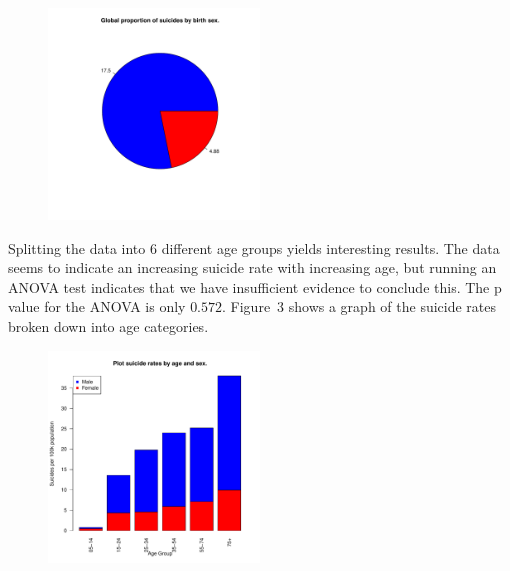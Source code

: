 \documentclass{article}
\begin{document}
\begin{figure}[h!]
\centering
\includegraphics[width=0.5\textwidth]{sui-by-sex.pdf}
\label{fig::sex}
\caption{}
\end{figure}

Splitting the data into \(6\) different age groups yields interesting results. The
data seems to indicate an increasing suicide rate with increasing age, but running an
ANOVA test indicates that we have insufficient evidence to conclude this. The p value
for the ANOVA is only \(0.572\). Figure~3 %
shows a graph of the suicide rates
broken down into age categories.

\begin{figure}[h!]
\centering
\includegraphics[width=0.5\textwidth]{sui-by-age-by-sex.pdf}
\label{fig::age}
\caption{}
\end{figure}
\end{document}
